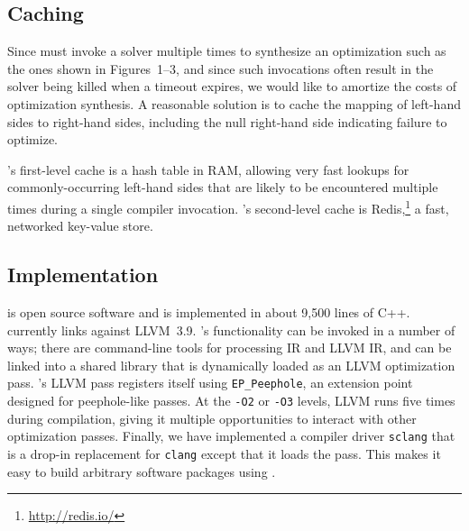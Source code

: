 \subsection{Caching}
\label{sec:cache}

Since \tool{} must invoke a solver multiple times to synthesize an
optimization such as the ones shown in Figures~1--3, and since such
invocations often result in the solver being killed when a timeout
expires, we would like to amortize the costs of optimization
synthesis.
%
A reasonable solution is to cache the mapping of left-hand sides to
right-hand sides, including the null right-hand side indicating
failure to optimize.


\tool's first-level cache is a hash table in RAM, allowing very fast
lookups for commonly-occurring left-hand sides that are likely to be
encountered multiple times during a single compiler invocation.
%
\tool's second-level cache is Redis,\footnote{\url{http://redis.io/}} a fast,
networked key-value store.
%

\subsection{Implementation}
\label{sec:impl}

\tool{} is open source software and is implemented in about 9,500
lines of C++.
%
\tool{} currently links against LLVM~3.9.
%
\tool{}'s functionality can be invoked in a number of ways; there are
command-line tools for processing \tool{} IR and LLVM IR, and \tool{}
can be linked into a shared library that is dynamically loaded as an
LLVM optimization pass.
%
\tool{}'s LLVM pass registers itself using \texttt{EP\_Peephole}, an
extension point designed for peephole-like passes.
%
At the \texttt{-O2} or \texttt{-O3} levels, LLVM runs \tool{} five
times during compilation, giving it multiple opportunities to interact
with other optimization passes.
%
Finally, we have implemented a compiler driver \texttt{sclang} that is
a drop-in replacement for \texttt{clang} except that it loads the
\tool{} pass.
%
This makes it easy to build arbitrary software packages using \tool.



